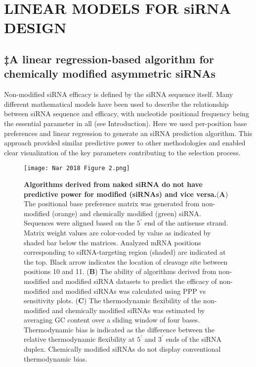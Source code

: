 \documentclass{report}
\begin{document}
\chapter{LINEAR MODELS FOR siRNA DESIGN}
\section{‡A linear regression-based algorithm for chemically modified asymmetric siRNAs}\label{sec:linear regression model‡}

Non-modified siRNA efficacy is defined by the siRNA sequence itself. Many different mathematical models have been used to describe the relationship between siRNA sequence and efficacy, with nucleotide positional frequency being the essential parameter in all (see Introduction). Here we used per-position base preferences and linear regression to generate an siRNA prediction algorithm. This approach provided similar predictive power to other methodologies \cite{huesken_design_2005, he_predicting_2017, pan_sipred_2011} and enabled clear visualization of the key parameters contributing to the selection process.


\begin{figure}
    \centering
    \texttt{[image: Nar 2018 Figure 2.png]}
    \caption{\textbf{Algorithms derived from naked siRNA do not have predictive power for modified (siRNAs) and vice versa.}(\textbf{A}) The positional base preference matrix was generated from non-modified (orange) \cite{huesken_design_2005} and chemically modified (green) siRNA. Sequences were aligned based on the $5^\prime$ end of the antisense strand. Matrix weight values are color-coded by value as indicated by shaded bar below the matrices. Analyzed mRNA positions corresponding to siRNA-targeting region (shaded) are indicated at the top. Black arrow indicates the location of cleavage site between positions 10 and 11. (\textbf{B}) The ability of algorithms derived from non-modified and modified siRNA datasets to predict the efficacy of non-modified and modified siRNAs was calculated using PPP vs sensitivity plots. (\textbf{C}) The thermodynamic flexibility of the non-modified and chemically modified siRNAs was estimated by averaging GC content over a sliding window of four bases. Thermodynamic bias is indicated as the difference between the relative thermodynamic flexibility at $5^\prime$ and $3^\prime$ ends of the siRNA duplex. Chemically modified siRNAs do not display conventional thermodynamic bias.}
    \label{fig:Figure‡ 2}
\end{figure}
\end{document}

